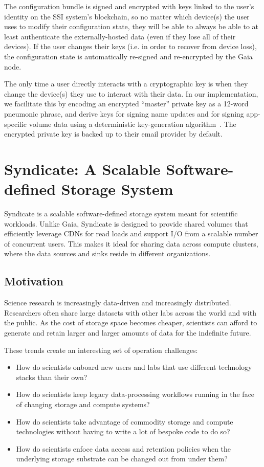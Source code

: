 The configuration bundle is signed and encrypted with keys linked to
the user's identity on the SSI system's blockchain, so no matter which device(s) the user
uses to modify their configuration state, they will be able to always be able to
at least authenticate the externally-hosted data (even if they lose all of their
devices).  If the user changes their keys (i.e. in order to recover from device
loss), the configuration state is
automatically re-signed and re-encrypted by the Gaia node.

The only time a user directly interacts with a cryptographic key is when they
change the device(s) they use to interact with their data.
In our implementation, we facilitate this by
encoding an encrypted ``master'' private key as a 12-word pneumonic phrase, and derive keys
for signing name updates and for signing app-specific volume data
using a deterministic key-generation
algorithm~\cite{bip39}.  The encrypted private key is backed up to their email provider by
default.

\section{Syndicate: A Scalable Software-defined Storage System}

Syndicate is a scalable software-defined storage system meant for scientific
workloads.  Unlike Gaia, Syndicate is designed to provide shared volumes that
efficiently leverage CDNs for read loads and 
support I/O from a scalable number of concurrent users.  This makes
it ideal for sharing data across compute clusters, where the data sources and
sinks reside in different organizations.

\subsection{Motivation}

Science research is increasingly data-driven and increasingly distributed.
Researchers often share large datasets with other labs across the world and 
with the public.  As the cost of storage space becomes cheaper, scientists can
afford to generate and retain larger and larger amounts of data for the
indefinite future.

These trends create an interesting set of operation challenges:

\begin{itemize}
   \item How do scientists onboard new users and labs that use different
      technology stacks than their own?
   \item How do scientists keep legacy data-processing workflows running in the face
      of changing storage and compute systems?
   \item How do scientists take advantage of commodity storage and
      compute technologies without having to write a lot of bespoke code
      to do so?
   \item How do scientists enfoce data access and retention policies when the
      underlying storage substrate can be changed out from under them?
\end{itemize}

